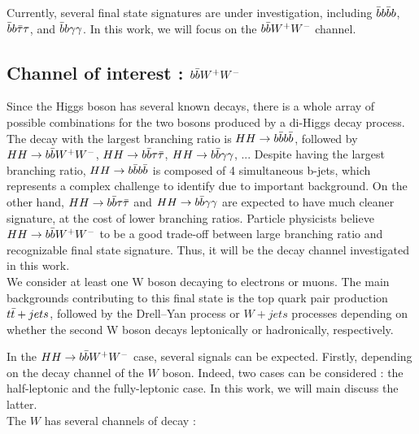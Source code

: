 
Currently, several final state signatures are under investigation, including $\Bar{b} b \Bar{b} b$, $\Bar{b} b \Bar{\tau} \tau$, and $\Bar{b} b \gamma \gamma$. In this work, we will focus on the $b \Bar{b} W^+ W^-$ channel.

\subsection{Channel of interest :  $b \Bar{b} W^+ W^-$ }

Since the Higgs boson has several known decays, there is a whole array of possible combinations for the two bosons produced by a di-Higgs decay process. The decay with the largest branching ratio is $HH \rightarrow b \Bar{b} b \Bar{b}$, followed by $HH \rightarrow b \Bar{b} W^+ W^-$, $HH \rightarrow b \Bar{b} \tau \Bar{\tau}$, $HH \rightarrow b \Bar{b} \gamma \gamma$, ... Despite having the largest branching ratio, $HH \rightarrow b \Bar{b} b \Bar{b}$ is composed of 4 simultaneous b-jets, which represents a complex challenge to identify due to important background. On the other hand, $HH \rightarrow b \Bar{b} \tau \Bar{\tau}$ and $HH \rightarrow b \Bar{b} \gamma \gamma $ are expected to have much cleaner signature, at the cost of lower branching ratios. Particle physicists believe $HH \rightarrow b \Bar{b} W^+ W^-$ to be a good trade-off between large branching ratio and recognizable final state signature. Thus, it will be the decay channel investigated in this work.\\
We consider at least one W boson decaying to electrons or muons. The main backgrounds contributing to this final state is the top quark pair production $t \Bar{t}+jets$, followed by the Drell–Yan process or $W+jets$ processes depending on whether the second W boson decays leptonically or hadronically, respectively. 

In the $HH \rightarrow b \Bar{b} W^+ W^-$ case, several signals can be expected. Firstly, depending on the decay channel of the $W$ boson. Indeed, two cases can be considered : the half-leptonic and the fully-leptonic case. In this work, we will main discuss the latter.\\
The $W$ has several channels of decay :


